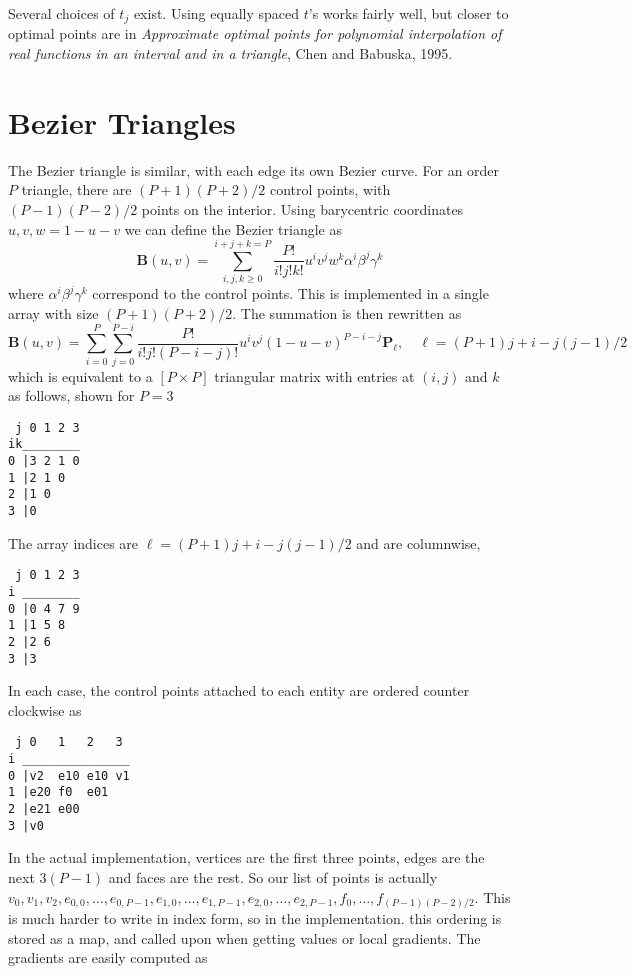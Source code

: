 \documentclass{article}
\begin{document}

    
Several choices of $t_j$ exist. Using equally spaced $t$'s works fairly well, but closer to optimal points are in \textit{Approximate optimal points for polynomial interpolation of real functions in an interval and in a triangle}, Chen and Babuska, 1995.
\section{Bezier Triangles}
The Bezier triangle is similar, with each edge its own Bezier curve. For an order $P$ triangle, there are $(P+1)(P+2)/2$ control points, with $(P-1)(P-2)/2$ points on the interior. Using barycentric coordinates $u,v,w = 1-u-v$ we can define the Bezier triangle as 
\[
\mathbf{B}(u,v) = \displaystyle\sum_{i,j,k\geq 0}^{i+j+k=P} \frac{P!}{i!j!k!}u^iv^jw^k \alpha^i\beta^j\gamma^k 
\]
where $\alpha^i\beta^j\gamma^k$ correspond to the control points. This is implemented in a single array with size $(P+1)(P+2)/2$. The summation is then rewritten as
\[
\mathbf{B}(u,v) = \displaystyle\sum_{i=0}^P \sum_{j=0}^{P-i}\frac{P!}{i!j!(P-i-j)!}u^iv^j(1-u-v)^{P-i-j}\mathbf{P}_\ell, \quad \ell = (P+1)j+i-j(j-1)/2
\]
which is equivalent to a $[P\times P]$ triangular matrix with entries at $(i,j)$ and $k$ as follows, shown for $P = 3$
\begin{verbatim}
 j 0 1 2 3
ik________
0 |3 2 1 0
1 |2 1 0   
2 |1 0 
3 |0 
\end{verbatim}
The array indices are $\ell = (P+1)j+i-j(j-1)/2$ and are columnwise,
\begin{verbatim}
 j 0 1 2 3
i ________ 
0 |0 4 7 9
1 |1 5 8   
2 |2 6 
3 |3 
\end{verbatim}
In each case, the control points attached to each entity are ordered counter clockwise as
\begin{verbatim}
 j 0   1   2   3
i _______________ 
0 |v2  e10 e10 v1
1 |e20 f0  e01   
2 |e21 e00 
3 |v0 
\end{verbatim}
In the actual implementation, vertices are the first three points, edges are the next $3(P-1)$ and faces are the rest. So our list of points is actually $v_0,v_1,v_2,e_{0,0},\ldots,e_{0,P-1},e_{1,0},\ldots,e_{1,P-1},e_{2,0},\ldots,e_{2,P-1},f_0,\ldots,f_{(P-1)(P-2)/2}$. This is much harder to write in index form, so in the implementation. this ordering is stored as a map, and called upon when getting values or local gradients. The gradients are easily computed as 
\end{document}
